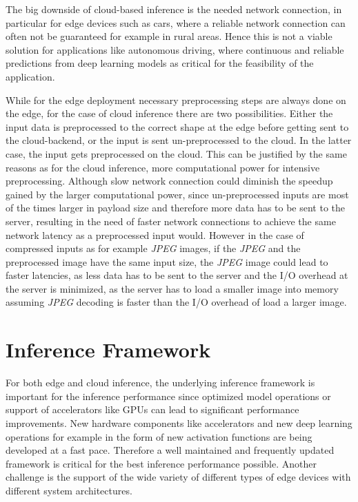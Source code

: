 The big downside of cloud-based inference is the needed network connection, in particular for edge devices such as cars, where a reliable network connection can often not be guaranteed for example in rural areas. Hence this is not a viable solution for applications like autonomous driving, where continuous and reliable predictions from deep learning models as critical for the feasibility of the application.

While for the edge deployment necessary preprocessing steps are always done on the edge, for the case of cloud inference there are two possibilities. Either the input data is preprocessed to the correct shape at the edge before getting sent to the cloud-backend, or the input is sent un-preprocessed to the cloud. 
In the latter case, the input gets preprocessed on the cloud. 
This can be justified by the same reasons as for the cloud inference, more computational power for intensive preprocessing.
Although slow network connection could diminish the speedup gained by the larger computational power, since un-preprocessed inputs are most of the times larger in payload size and therefore more data has to be sent to the server, resulting in the need of faster network connections to achieve the same network latency as a preprocessed input would.
However in the case of compressed inputs as for example \emph{JPEG} images, if the \emph{JPEG} and the preprocessed image have the same input size, the \emph{JPEG} image could lead to faster latencies, as less data has to be sent to the server and the I/O overhead at the server is minimized, as the server has to load a smaller image into memory assuming \emph{JPEG} decoding is faster than the I/O overhead of load a larger image. 



\section{Inference Framework}
For both edge and cloud inference, the underlying inference framework is important for the inference performance since optimized model operations or support of accelerators like GPUs can lead to significant performance improvements.
New hardware components like accelerators and new deep learning operations for example in the form of new activation functions are being developed at a fast pace. Therefore a well maintained and frequently updated framework is critical for the best inference performance possible.
Another challenge is the support of the wide variety of different types of edge devices with different system architectures.

